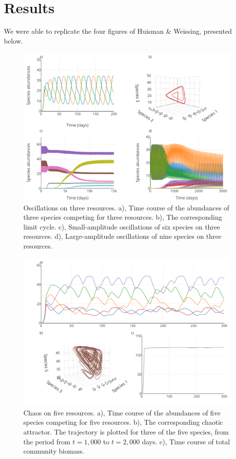 \section{Results}
We were able to replicate the four figures of Huisman \& Weissing\supercite{1999:Huisman}, presented below. 
\begin{figure}[H]
\begin{center} 
 \includegraphics[width=1\textwidth]{../Code/Figures/Figure_1.pdf}
  \caption{Oscillations on three resources. a), Time course of the abundances 
of three species competing for three resources. b), The corresponding limit 
cycle. c), Small-amplitude oscillations of six species on three resources. 
d), Large-amplitude oscillations of nine species on three resources.}
  \label{figures:Fig1}
\end{center}
\end{figure}
\begin{figure}[H]
\begin{center} 
 \includegraphics[width=1\textwidth]{../Code/Figures/Figure_2.pdf}
  \caption{Chaos on five resources. a), Time course of the abundances of five 
species competing for five resources. b), The corresponding chaotic attractor. 
The trajectory is plotted for three of the five species, from the period from 
$t= 1,000$ to $t=2,000$ days. c), Time course of total community biomass.}
  \label{figures:Fig2}
\end{center}
\end{figure}
